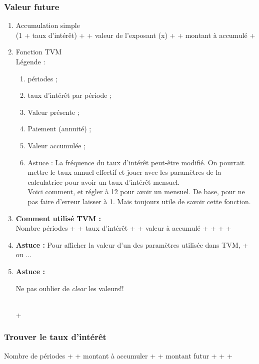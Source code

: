 \subsubsection{Valeur future}
\begin{enumerate}

\item Accumulation simple
\\ (1 + taux d'intérêt) +  + valeur de l'exposant (x) +  + montant à accumulé + \fbox{=}
\item Fonction TVM
\\ Légende :

\begin{enumerate}
\item {} périodes ;
\item {} taux d'intérêt par période ;
\item {} Valeur présente ;
\item {} Paiement (annuité) ;
\item {} Valeur accumulée ;
\item Astuce : La fréquence du taux d'intérêt peut-être modifié. On pourrait mettre le taux annuel effectif et jouer avec les paramètres de la calculatrice pour avoir un taux d'intérêt mensuel.
\\ Voici comment,  et régler à 12 pour avoir un mensuel. De base, pour ne pas faire d'erreur laisser à 1. Mais toujours utile de savoir cette fonction.
\end{enumerate}

\item \textbf{Comment utilisé TVM :}
\\ Nombre périodes +  + taux d'intérêt +  + valeur à accumulé + \fbox{+$ / $-} +  +  + 
\\ 
\item \textbf{Astuce :} Pour afficher la valeur d'un des paramètres utilisée dans TVM,  +  ou ... 
\\
\item \textbf{Astuce :}
\begin{LARGE}
Ne pas oublier de \textit{clear} les valeurs!!
\end{LARGE}
\\  + 

\end{enumerate}

\subsubsection{Trouver le taux d'intérêt}
Nombre de périodes +  + montant à accumuler +  + montant futur +  +  + 


